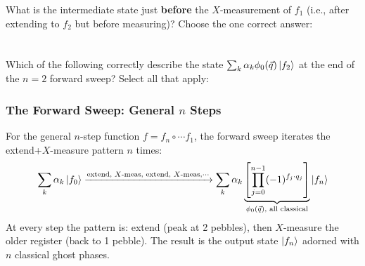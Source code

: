 What is the intermediate state just \textbf{before} the $X$-measurement of $f_1$ (i.e., after extending to $f_2$ but before measuring)? Choose the one correct answer: \\
\noindent{} 
\newline \\\\
Which of the following correctly describe the state $\sum_k \alpha_k \phi_0(\vec{q})\ket{f_2}$ at the end of the $n=2$ forward sweep? Select all that apply: \\
\noindent{}

\subsubsection{The Forward Sweep: General $n$ Steps}
For the general $n$-step function $f = f_n \circ \cdots f_1$, the forward sweep iterates the extend+$X$-measure pattern $n$ times:
\begin{equation}
    \sum_k \alpha_k \ket{f_0} \xrightarrow[]{\text{extend, }X\text{-meas, extend, }X\text{-meas,}\cdots}\sum_k \alpha_k \underbrace{\left[ \prod_{j=0}^{n-1}(-1)^{f_j \cdot q_j} \right]}_{\phi_0(\vec{q})\text{, all classical}} \ket{f_n}
\end{equation}
At every step the pattern is: extend (peak at 2 pebbles), then $X$-measure the older register (back to 1 pebble). The result is the output state $\ket{f_n}$ adorned with $n$ classical ghost phases. \\

